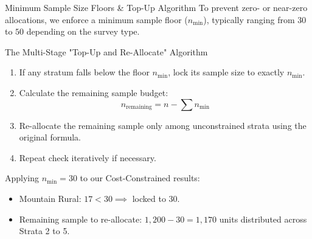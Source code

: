 \documentclass[10pt, aspectratio=169]{beamer}
\begin{document}
  \begin{frame}{Minimum Sample Size Floors \& Top-Up Algorithm}
      To prevent zero- or near-zero allocations, we enforce a minimum sample floor ($n_{\min}$), typically ranging from $30$ to $50$ depending on the survey type.
      
      \begin{block}{The Multi-Stage "Top-Up and Re-Allocate" Algorithm}
          \begin{enumerate}
              \item If any stratum falls below the floor $n_{\min}$, lock its sample size to exactly $n_{\min}$.
              \item Calculate the remaining sample budget: 
              $$n_{\text{remaining}} = n - \sum n_{\min}$$
              \item Re-allocate the remaining sample only among unconstrained strata using the original formula.
              \item Repeat check iteratively if necessary.
          \end{enumerate}
      \end{block}
      
      Applying $n_{\min} = 30$ to our Cost-Constrained results:
      \begin{itemize}
          \item Mountain Rural: $17 < 30 \implies$ locked to $30$.
          \item Remaining sample to re-allocate: $1,200 - 30 = 1,170$ units distributed across Strata 2 to 5.
      \end{itemize}
  \end{frame}
  
\end{document}

